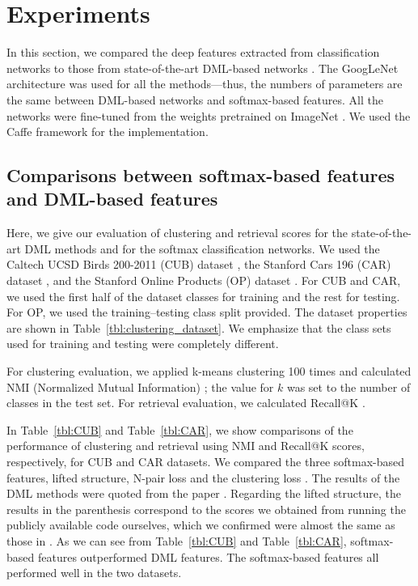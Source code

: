\documentclass[9pt,technote,compsoc]{./sty/IEEEtran}
\newcommand{\Tref}[1]{Table~\ref{#1}}
\begin{document}
\section{Experiments}

In this section, we compared the deep features extracted from classification networks to those from state-of-the-art DML-based networks \cite{song2016deep}\cite{sohn2016improved}\cite{song2017learnable}.
The GoogLeNet architecture \cite{szegedy2015going} was used for all the methods---thus, the numbers of parameters are the same between DML-based networks and softmax-based features.
All the networks were fine-tuned from the weights pretrained on ImageNet \cite{russakovsky2015imagenet}.
We used the Caffe \cite{jia2014caffe} framework for the implementation.

\subsection{Comparisons between softmax-based features and DML-based features}
\label{sec:clustering}

Here, we give our evaluation of clustering and retrieval scores for the state-of-the-art DML methods \cite{song2016deep}\cite{sohn2016improved}\cite{song2017learnable} and for the softmax classification networks.
We used the Caltech UCSD Birds 200-2011 (CUB) dataset \cite{wah2011caltech}, the Stanford Cars 196 (CAR) dataset \cite{krause20133d}, and the Stanford Online Products (OP) dataset \cite{song2016deep}.
For CUB and CAR, we used the first half of the dataset classes for training and the rest for testing.
For OP, we used the training--testing class split provided.
The dataset properties are shown in \Tref{tbl:clustering_dataset}.
We emphasize that the class sets used for training and testing were completely different.

For clustering evaluation, we applied k-means clustering 100 times and calculated 
NMI (Normalized Mutual Information) \cite{manning2009introduction}; the value for $k$ was set to the number of classes in the test set.
For retrieval evaluation, we calculated Recall@K \cite{jegou2011product}.


In \Tref{tbl:CUB} and \Tref{tbl:CAR}, we show comparisons of the performance of clustering and retrieval using NMI and Recall@K scores, respectively, for CUB and CAR datasets. We compared the three softmax-based features, lifted structure\cite{song2016deep}, N-pair loss \cite{sohn2016improved} and the clustering loss \cite{song2017learnable}.
The results of the DML methods were quoted from the paper \cite{song2017learnable}. 
Regarding  the lifted structure\cite{song2016deep}, the results in the parenthesis correspond to the scores 
we obtained from running the publicly available code ourselves, which we confirmed were almost the same as those in \cite{song2017learnable}. 
As we can see from \Tref{tbl:CUB} and \Tref{tbl:CAR}, softmax-based features outperformed DML features. 
The softmax-based features all performed well in the two datasets.
\end{document}
